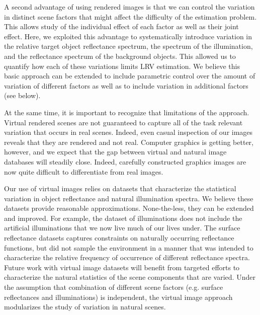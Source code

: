 \documentclass{jov}
\begin{document}
A second advantage of using rendered images is that we can control the variation in distinct
scene factors that might affect the difficulty of the estimation problem.
This allows study of the individual effect of each factor as well as their joint effect.
Here, we exploited this advantage to systematically introduce variation in the relative target object reflectance
spectrum, the spectrum of the illumination, and the reflectance spectrum of the background objects.
This allowed us to quantify how each of these variations limits LRV estimation.
We believe this basic approach can be extended to include parametric control over the amount
of variation of different factors as well as to include variation in additional factors (see below).

At the same time, it is important to recognize that limitations of the approach.
Virtual rendered scenes are not guaranteed to capture all of the task relevant
variation that occurs in real scenes.
Indeed, even casual inspection of our images reveals that they are rendered and
not real.
Computer graphics is getting better, however, and we expect that the gap between
virtual and natural image databases will steadily close.
Indeed, carefully constructed graphics images are now quite difficult to differentiate
from real images.

Our use of virtual images relies on datasets that characterize the statistical variation
in object reflectance and natural illumination spectra.
We believe these datasets provide reasonable approximations.
None-the-less, they can be extended and improved.
For example, the dataset of illuminations does not include the artificial illuminations
that we now live much of our lives under.
The surface reflectance datasets captures constraints on naturally occurring reflectance
functions, but did not sample the environment in a manner that was intended to 
characterize the relative frequency of occurrence of different reflectance spectra.
Future work with virtual image datasets will benefit from targeted efforts to characterize
the natural statistics of the scene components that are varied.
Under the assumption that combination of different scene factors (e.g. surface reflectances
and illuminations) is independent, the virtual image approach modularizes the study
of variation in natural scenes.
\end{document}
